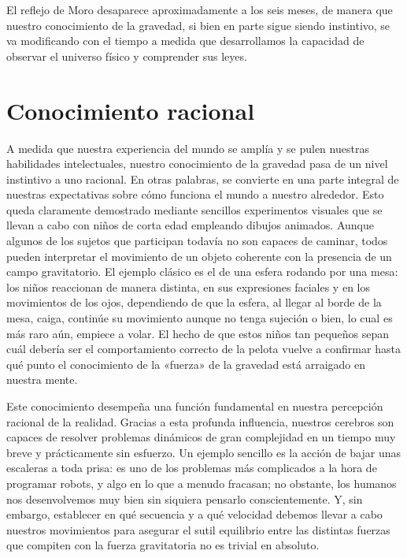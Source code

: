 El reflejo de Moro desaparece aproximadamente a los seis meses, de manera que nuestro
conocimiento de la gravedad, si bien en parte sigue siendo instintivo, se va modificando
con el tiempo a medida que desarrollamos la capacidad de observar el universo físico
y comprender sus leyes.

\section{Conocimiento racional}\label{sec:01-rational}

A medida que nuestra experiencia del mundo se amplía y se pulen nuestras habilidades
intelectuales, nuestro conocimiento de la gravedad pasa de un nivel instintivo a uno
racional. En otras palabras, se convierte en una parte integral de nuestras expectativas
sobre cómo funciona el mundo a nuestro alrededor. Esto queda claramente demostrado
mediante sencillos experimentos visuales que se llevan a cabo con niños de corta edad
empleando dibujos animados. Aunque algunos de los sujetos que participan todavía no
son capaces de caminar, todos pueden interpretar el movimiento de un objeto coherente
con la presencia de un campo gravitatorio. El ejemplo clásico es el de una esfera
rodando por una mesa: los niños reaccionan de manera distinta, en sus expresiones
faciales y en los movimientos de los ojos, dependiendo de que la esfera, al llegar al
borde de la mesa, caiga, continúe su movimiento aunque no tenga sujeción o bien, lo
cual es más raro aún, empiece a volar. El hecho de que estos niños tan pequeños sepan
cuál debería ser el comportamiento correcto de la pelota vuelve a confirmar hasta qué
punto el conocimiento de la «fuerza» de la gravedad está arraigado en nuestra mente.

Este conocimiento desempeña una función fundamental en nuestra percepción
racional de la realidad. Gracias a esta profunda influencia, nuestros cerebros son
capaces de resolver problemas dinámicos de gran complejidad en un tiempo muy breve y
prácticamente sin esfuerzo. Un ejemplo sencillo es la
acción de bajar unas escaleras a toda prisa: es uno de los problemas más complicados
a la hora de programar robots, y algo en lo que a menudo fracasan; no obstante, los
humanos nos desenvolvemos muy bien sin siquiera pensarlo conscientemente. Y, sin
embargo, establecer en qué secuencia y a qué velocidad debemos llevar a cabo nuestros
movimientos para asegurar el sutil equilibrio entre las distintas fuerzas que compiten
con la fuerza gravitatoria no es trivial en absoluto.

